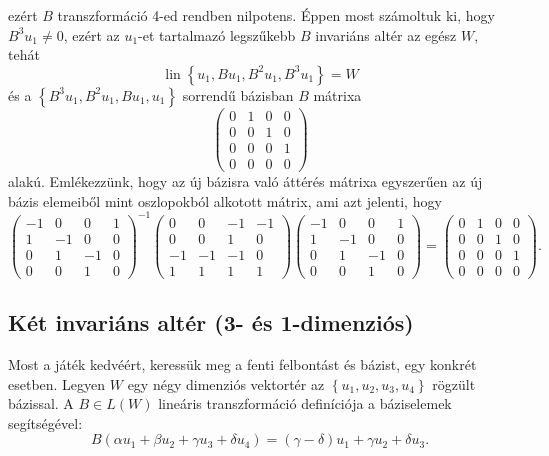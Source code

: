 \documentclass[a4paper, showtrims]{memoir}
\theoremstyle{plain}
\theoremstyle{remark}
\theoremstyle{definition}
\DeclareMathOperator{\lin}{lin}
\begin{document}
ezért $B$ transzformáció 4-ed rendben nilpotens.
Éppen most számoltuk ki, hogy $B^3u_1\neq 0$, ezért
az $u_1$-et tartalmazó legszűkebb $B$ invariáns altér az egész $W$,
tehát
\[
	\lin\left\{ u_1,Bu_1,B^2u_1,B^3u_1 \right\}=W
\]
és a $\left\{ B^3u_1,B^2u_1,Bu_1,u_1 \right\}$ sorrendű bázisban $B$ mátrixa
\[
	\begin{pmatrix}
		0 & 1 & 0 & 0 \\
		0 & 0 & 1 & 0 \\
		0 & 0 & 0 & 1 \\
		0 & 0 & 0 & 0
	\end{pmatrix}
\]
alakú.
Emlékezzünk, hogy az új bázisra való áttérés mátrixa egyszerűen az új bázis
elemeiből mint oszlopokból alkotott mátrix, ami azt jelenti, hogy
\[
	\begin{pmatrix}
		-1 & 0  & 0  & 1 \\
		1  & -1 & 0  & 0 \\
		0  & 1  & -1 & 0 \\
		0  & 0  & 1  & 0
	\end{pmatrix}^{-1}
	\begin{pmatrix}
		0  & 0  & -1 & -1 \\
		0  & 0  & 1  & 0  \\
		-1 & -1 & -1 & 0  \\
		1  & 1  & 1  & 1
	\end{pmatrix}
	\begin{pmatrix}
		-1 & 0  & 0  & 1 \\
		1  & -1 & 0  & 0 \\
		0  & 1  & -1 & 0 \\
		0  & 0  & 1  & 0
	\end{pmatrix}
	=
	\begin{pmatrix}
		0 & 1 & 0 & 0 \\
		0 & 0 & 1 & 0 \\
		0 & 0 & 0 & 1 \\
		0 & 0 & 0 & 0
	\end{pmatrix}.
\]
\subsection{Két invariáns altér (3- és 1-dimenziós)}
Most a játék kedvéért, keressük meg a fenti  felbontást és bázist, egy konkrét esetben.
Legyen $W$ egy négy dimenziós vektortér az $\left\{ u_1,u_2,u_3,u_4 \right\}$ rögzült bázissal.
A $B\in L\left( W \right)$ lineáris transzformáció definíciója a báziselemek segítségével:
\[
	B\left( \alpha u_1+\beta u_2 +\gamma u_3+\delta u_4 \right)
	=
	\left( \gamma-\delta \right)u_1+
	\gamma u_2+
	\delta u_3.
\]
\end{document}
